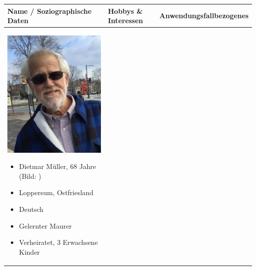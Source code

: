 \begin{center}
	\begin{tabular}{| p{} | p{} | p{} |}
		\hline
		\cellcolor{blue!25}Name / Soziographische Daten & \cellcolor{red!25}Hobbys \& Interessen & \cellcolor{green!25}Anwendungsfallbezogenes \\
		\hline
		\vspace{0.3mm}
		\begin{minipage}{.2\textwidth}
			\includegraphics[width=\linewidth]{../pictures/persona1.jpg}
		\end{minipage}
		\begin{itemize}
			\item Dietmar Müller, 68 Jahre (Bild: \cite{persona1})
			\item Loppersum, Ostfriesland
			\item Deutsch 
			\item Gelernter Maurer
			\item Verheiratet, 3 Erwachsene Kinder
		\end{itemize}

\end{tabular}
\end{center}
